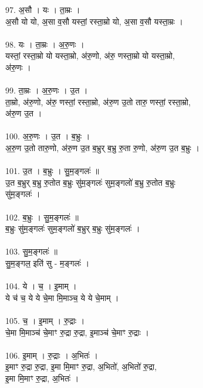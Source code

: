 \subsubsection{}
97. अ॒सौ । यः । ता॒म्रः ।\\
अ॒सौ यो यो, अ॒सा व॒सौ यस्तां॒ रस्ता॒म्रो यो, अ॒सा व॒सौ यस्ता॒म्रः ।\\
\\
98. यः । ता॒म्रः । अ॒रु॒णः ।\\
यस्तां॒ रस्ता॒म्रो यो यस्ता॒म्रो, अ॑रु॒णो, अ॑रु॒ णस्ता॒म्रो यो यस्ता॒म्रो,\\
अ॑रु॒णः ।\\
\\
99. ता॒म्रः । अ॒रु॒णः । उ॒त ।\\
ता॒म्रो, अ॑रु॒णो, अ॑रु॒ णस्तां॒ रस्ता॒म्रो, अ॑रु॒ण उ॒तो तारु॒ णस्तां॒ रस्ता॒म्रो,\\
अ॑रु॒ण उ॒त ।\\
\\
100. अ॒रु॒णः । उ॒त । ब॒भ्रुः ।\\
अ॒रु॒ण उ॒तो तारु॒णो, अ॑रु॒ण उ॒त ब॒भ्रुर् ब॒भ्रु रु॒ता रु॒णो, अ॑रु॒ण उ॒त ब॒भ्रुः ।\\
\\
101. उ॒त । ब॒भ्रुः । सु॒म॒ङ्गलः॑ ॥\\
उ॒त ब॒भ्रुर् ब॒भ्रु रु॒तोत ब॒भ्रुः सु॑म॒ङ्गलः॑ सुम॒ङ्गलो॑ ब॒भ्रु रु॒तोत ब॒भ्रुः\\
सु॑म॒ङ्गलः॑ ।\\
\\
102. ब॒भ्रुः । सु॒म॒ङ्गलः॑ ॥\\
ब॒भ्रुः सु॑म॒ङ्गलः॑ सुम॒ङ्गलो॑ ब॒भ्रुर् ब॒भ्रुः सु॑म॒ङ्गलः॑ ।\\
\\
103. सु॒म॒ङ्गलः॑ ॥\\
सु॒म॒ङ्गल॒ इति॑ सु - म॒ङ्गलः॑ ।\\
\\
104. ये । च॒ । इ॒माम् ।\\
ये च॑ च॒ ये ये चे॒मा मि॒माञ्च॒ ये ये चे॒माम् ।\\
\\
105. च॒ । इ॒माम् । रु॒द्राः ।\\
चे॒मा मि॒माञ्च॑ चे॒माꣳ रु॒द्रा रु॒द्रा, इ॒माञ्च॑ चे॒माꣳ रु॒द्राः ।\\
\\
106. इ॒माम् । रु॒द्राः । अ॒भितः॑ ।\\
इ॒माꣳ रु॒द्रा रु॒द्रा, इ॒मा मि॒माꣳ रु॒द्रा, अ॒भितो॑, अ॒भितो॑ रु॒द्रा,\\
इ॒मा मि॒माꣳ रु॒द्रा, अ॒भितः॑ ।\\
